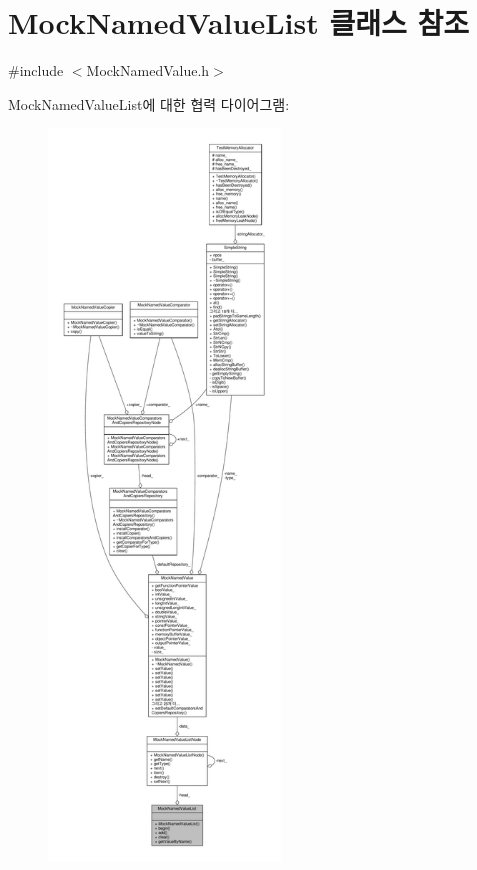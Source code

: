 \hypertarget{class_mock_named_value_list}{}\section{Mock\+Named\+Value\+List 클래스 참조}
\label{class_mock_named_value_list}


{\ttfamily \#include $<$Mock\+Named\+Value.\+h$>$}



Mock\+Named\+Value\+List에 대한 협력 다이어그램\+:
\nopagebreak
\begin{figure}[H]
\begin{center}
\leavevmode
\includegraphics[height=550pt]{class_mock_named_value_list__coll__graph}
\end{center}
\end{figure}
